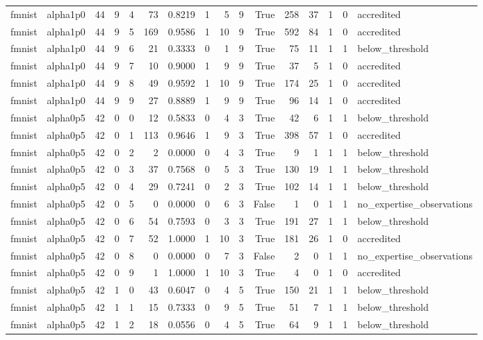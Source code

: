 \begin{tabular}{llrrrrrrrrrrrrrl}
fmnist & alpha1p0 & 44 & 9 & 4 & 73 & 0.8219 & 1 & 5 & 9 & True & 258 & 37 & 1 & 0 & accredited \\
fmnist & alpha1p0 & 44 & 9 & 5 & 169 & 0.9586 & 1 & 10 & 9 & True & 592 & 84 & 1 & 0 & accredited \\
fmnist & alpha1p0 & 44 & 9 & 6 & 21 & 0.3333 & 0 & 1 & 9 & True & 75 & 11 & 1 & 1 & below\_threshold \\
fmnist & alpha1p0 & 44 & 9 & 7 & 10 & 0.9000 & 1 & 9 & 9 & True & 37 & 5 & 1 & 0 & accredited \\
fmnist & alpha1p0 & 44 & 9 & 8 & 49 & 0.9592 & 1 & 10 & 9 & True & 174 & 25 & 1 & 0 & accredited \\
fmnist & alpha1p0 & 44 & 9 & 9 & 27 & 0.8889 & 1 & 9 & 9 & True & 96 & 14 & 1 & 0 & accredited \\
fmnist & alpha0p5 & 42 & 0 & 0 & 12 & 0.5833 & 0 & 4 & 3 & True & 42 & 6 & 1 & 1 & below\_threshold \\
fmnist & alpha0p5 & 42 & 0 & 1 & 113 & 0.9646 & 1 & 9 & 3 & True & 398 & 57 & 1 & 0 & accredited \\
fmnist & alpha0p5 & 42 & 0 & 2 & 2 & 0.0000 & 0 & 4 & 3 & True & 9 & 1 & 1 & 1 & below\_threshold \\
fmnist & alpha0p5 & 42 & 0 & 3 & 37 & 0.7568 & 0 & 5 & 3 & True & 130 & 19 & 1 & 1 & below\_threshold \\
fmnist & alpha0p5 & 42 & 0 & 4 & 29 & 0.7241 & 0 & 2 & 3 & True & 102 & 14 & 1 & 1 & below\_threshold \\
fmnist & alpha0p5 & 42 & 0 & 5 & 0 & 0.0000 & 0 & 6 & 3 & False & 1 & 0 & 1 & 1 & no\_expertise\_observations \\
fmnist & alpha0p5 & 42 & 0 & 6 & 54 & 0.7593 & 0 & 3 & 3 & True & 191 & 27 & 1 & 1 & below\_threshold \\
fmnist & alpha0p5 & 42 & 0 & 7 & 52 & 1.0000 & 1 & 10 & 3 & True & 181 & 26 & 1 & 0 & accredited \\
fmnist & alpha0p5 & 42 & 0 & 8 & 0 & 0.0000 & 0 & 7 & 3 & False & 2 & 0 & 1 & 1 & no\_expertise\_observations \\
fmnist & alpha0p5 & 42 & 0 & 9 & 1 & 1.0000 & 1 & 10 & 3 & True & 4 & 0 & 1 & 0 & accredited \\
fmnist & alpha0p5 & 42 & 1 & 0 & 43 & 0.6047 & 0 & 4 & 5 & True & 150 & 21 & 1 & 1 & below\_threshold \\
fmnist & alpha0p5 & 42 & 1 & 1 & 15 & 0.7333 & 0 & 9 & 5 & True & 51 & 7 & 1 & 1 & below\_threshold \\
fmnist & alpha0p5 & 42 & 1 & 2 & 18 & 0.0556 & 0 & 4 & 5 & True & 64 & 9 & 1 & 1 & below\_threshold \\

\end{tabular}
